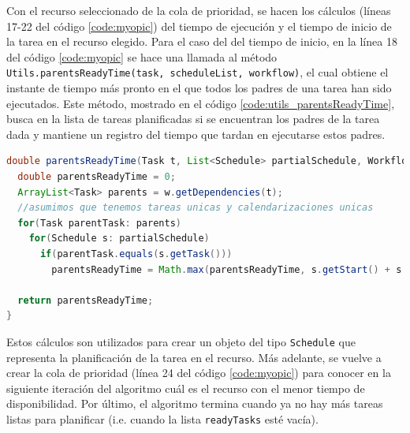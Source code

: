 Con el recurso seleccionado de la cola de prioridad, se hacen los cálculos (líneas 17-22 del código \ref{code:myopic}) del tiempo de ejecución y el tiempo de inicio de la tarea en el recurso elegido. Para el caso del del tiempo de inicio, en la línea 18 del código \ref{code:myopic} se hace una llamada al método \texttt{Utils.parentsReadyTime(task, scheduleList, workflow)}, el cual obtiene el instante de tiempo más pronto en el que todos los padres de una tarea han sido ejecutados. Este método, mostrado en el código \ref{code:utils_parentsReadyTime}, busca en la lista de tareas planificadas si se encuentran los padres de la tarea dada y mantiene un registro del tiempo que tardan en ejecutarse estos padres.

\begin{lstlisting}[language=java,label={code:utils_parentsReadyTime},caption={Método que calcula el tiempo mínimo en el que los padres de una tarea dada han sido ejecutados.},float]
double parentsReadyTime(Task t, List<Schedule> partialSchedule, Workflow w) {
  double parentsReadyTime = 0;
  ArrayList<Task> parents = w.getDependencies(t);
  //asumimos que tenemos tareas unicas y calendarizaciones unicas
  for(Task parentTask: parents)
    for(Schedule s: partialSchedule)
      if(parentTask.equals(s.getTask()))
        parentsReadyTime = Math.max(parentsReadyTime, s.getStart() + s.getDuration());

  return parentsReadyTime;
}
\end{lstlisting}

Estos cálculos son utilizados para crear un objeto del tipo \texttt{Schedule} que representa la planificación de la tarea en el recurso. Más adelante, se vuelve a crear la cola de prioridad (línea 24 del código \ref{code:myopic}) para conocer en la siguiente iteración del algoritmo cuál es el recurso con el menor tiempo de disponibilidad. Por último, el algoritmo termina cuando ya no hay más tareas listas para planificar (i.e. cuando la lista \texttt{readyTasks} esté vacía).

